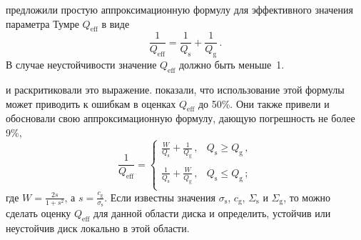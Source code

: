 \documentclass[russian,12pt]{article}
\def\be{\begin{equation}}
\def\ee{\end{equation}}
\begin{document}
\cite{WS94} предложили простую аппроксимационную формулу для 
эффективного значения параметра Тумре $Q_\mathrm{eff}$ в виде
\begin{equation}
\frac{1}{Q_\mathrm{eff}} = \frac{1}{Q_\mathrm{s}} + \frac{1}{Q_\mathrm{g}} \, .
\label{WS}
\end{equation}
В случае неустойчивости значение $Q_\mathrm{eff}$ должно быть меньше~1.

\cite{Jog96} и \cite{RW11} раскритиковали это выражение. 
\cite{RW11} показали, что использование этой формулы может приводить к 
ошибкам в оценках $Q_\mathrm{eff}$ до 50\%. Они также привели и обосновали 
свою аппроксимационную формулу, дающую погрешность не более 9\%,
\be
\frac{1}{Q_\mathrm{eff}} = 
\left\{
\begin{array}{rc}
\displaystyle \frac{W}{Q_\mathrm{s}} + \frac{1}{Q_\mathrm{g}} \, , 
& Q_\mathrm{s} \geq Q_\mathrm{g}\, , \\
& \\
\displaystyle \frac{1}{Q_\mathrm{s}} + \frac{W}{Q_\mathrm{g}} \, , 
& Q_\mathrm{s} \leq Q_\mathrm{g}\,  ; \\
\end{array}
\right.
\label{RW11}
\ee
где $\displaystyle W = \frac{2s}{1 + s^2}$, а 
$\displaystyle s = \frac{c_\mathrm{g}}{\sigma_\mathrm{s}}$. Если 
известны значения $\sigma_\mathrm{s}$, $c_\mathrm{g}$, $\Sigma_\mathrm{s}$ 
и $\Sigma_\mathrm{g}$, то можно сделать оценку $Q_\mathrm{eff}$ для 
данной области диска и определить, устойчив или неустойчив диск 
локально в этой области.
\end{document}
